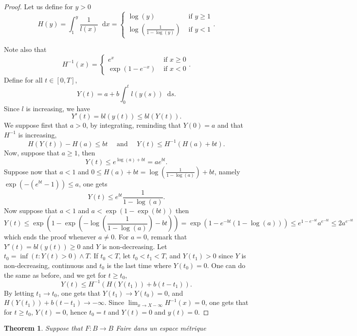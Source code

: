 \documentclass[a4paper,11pt, reqno]{amsart}
\newcommand{\dd}{\mathop{}\!\mathrm{d}}
\newcommand{\red}[1]{{\color{red} #1}}
\newcommand{\1}{\mathbbm{1}}
\theoremstyle{plain}
\newtheorem{theorem}{Theorem}[section]
\theoremstyle{definition}
\begin{document}
\begin{proof}
  Let us define for $y > 0$
  \[ H (y) = \int_1^y \frac{1}{l (x)} \dd x = \left\{\begin{array}{ll}
       \log (y) &  \text{ if } y \ge 1\\
       \log \left( \frac{1}{1 - \log (y)} \right) &  \text{ if } y < 1
     \end{array}\right. . \]
  
  
  Note also that
  \[ H^{- 1} (x) = \left\{\begin{array}{ll}
       e^x &  \text{ if } x \ge 0\\
       \exp (1 - e^{- x}) &  \text{ if } x < 0
     \end{array}\right. . \]
  Define for all $t \in [0, T]$,
  \[ Y (t) = a + b \int_0^t l (y (s)) \dd s. \]
  Since $l$ is increasing, we have
  \[ Y' (t) = b l (y (t)) \le b l (Y (t)) . \]
  We suppose first that $a > 0$, by integrating, reminding that $Y (0) = a$
  and that $H^{- 1}$ is increasing,
  \[ H (Y (t)) - H (a) \le b t \quad  \text{ and } \quad Y (t) \le
     H^{- 1} (H (a) + b t) . \]
  Now, suppose that $a \ge 1$, then
  \[ Y (t) \le e^{\log (a) + b t} = a e^{b t} . \]
  Suppose now that $a < 1$ and $0 \le H (a) + b t = \log \left(
  \frac{1}{1 - \log (a)} \right) + b t$, namely $\exp (- (e^{b t} - 1))
  \le a$, one gets
  \[ Y (t) \le e^{b t} \frac{1}{1 - \log (a)} . \]
  Now suppose that $a < 1$ and $a < \exp (1 - \exp (b t))$ then
  \[ Y (t) \le \exp \left( 1 - \exp \left( - \log \left( \frac{1}{1 -
     \log (a)} \right) - b t \right) \right) = \exp (1 - e^{- b t} (1 - \log
     (a))) \le e^{1 - e^{- b t}} a^{e^{- b t}} \le 2 a^{e^{- b t}}
  \]
  which ends the proof whenever $a \neq 0$. For $a = 0$, remark that $Y' (t) =
  b l (y (t)) \ge 0$ and $Y$ is non-decreasing. Let $t_0 = \inf (t : Y
  (t) > 0) \wedge T$. If $t_0 < T$, let $t_0 < t_1 < T$, and $Y (t_1) > 0$
  since $Y$ is non-decreasing, continuous and $t_0$ is the last time where $Y
  (t_0) = 0$. One can do the same as before, and we get for $t \ge t_0$,
  \[ Y (t) \le H^{- 1} (H (Y (t_1)) + b (t - t_1)) . \]
  By letting $t_1 \rightarrow t_0$, one gets that $Y (t_1) \rightarrow Y (t_0)
  = 0$, and $H (Y (t_1)) + b (t - t_1) \rightarrow - \infty$. Since $\lim_{x
  \rightarrow X - \infty} H^{- 1} (x) = 0$, one gets that for $t \ge
  t_0$, $Y (t) = 0$, hence $t_0 = t$ and $Y (t) = 0$ and $y (t) = 0$.
\end{proof}

\begin{theorem}
  Suppose that $F : B \rightarrow B$ \red{Faire dans un espace
  m{\'e}trique}
\end{theorem}
\end{document}
